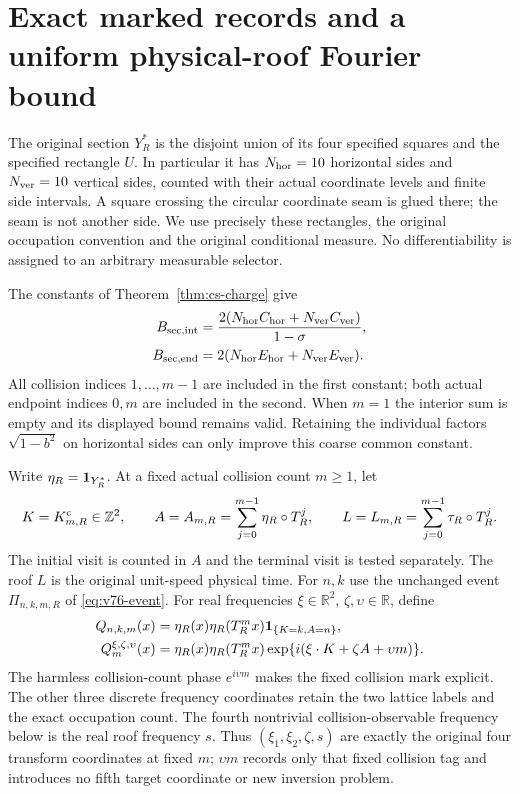 \section{Exact marked records and a uniform physical-roof Fourier bound}
\label{sec:rv-records}

The original section $Y_R^*$ is the disjoint union of its four
specified squares and the specified rectangle $U$. In particular it
has $N_{\rm hor}=10$ horizontal sides and $N_{\rm ver}=10$ vertical
sides, counted with their actual coordinate levels and finite side
intervals. A square crossing the circular coordinate seam is glued
there; the seam is not another side. We use precisely these rectangles,
the original occupation convention and the original conditional measure.
No differentiability is assigned to an arbitrary measurable selector.

The constants of Theorem~\ref{thm:cs-charge} give
\begin{align}
 B_{\rm sec,int}
   &=\frac{2(N_{\rm hor}C_{\rm hor}
                          +N_{\rm ver}C_{\rm ver})}{1-\sigma},
                                                        \label{eq:rv-section-budget}\\
 B_{\rm sec,end}
   &=2(N_{\rm hor}E_{\rm hor}+N_{\rm ver}E_{\rm ver}).\notag
\end{align}
All collision indices $1,\ldots,m-1$ are included in the first
constant; both actual endpoint indices $0,m$ are included in the
second. When $m=1$ the interior sum is empty and its displayed
bound remains valid. Retaining the individual factors
$\sqrt{1-b^2}$ on horizontal sides can only improve this coarse
common constant.

Write $\eta_R=\mathbf1_{Y_R^*}$. At a fixed actual collision count
$m\ge1$, let
\[
 K=K^{\rm c}_{m,R}\in\mathbb Z^2,\qquad
 A=A_{m,R}=\sum_{j=0}^{m-1}\eta_R\circ T_R^j,\qquad
 L=L_{m,R}=\sum_{j=0}^{m-1}\tau_R\circ T_R^j.
\]
The initial visit is counted in $A$ and the terminal visit is tested
separately. The roof $L$ is the original unit-speed physical time.
For $n,k$ use the unchanged event $\Pi_{n,k,m,R}$ of
\eqref{eq:v76-event}. For real frequencies
$\xi\in\mathbb R^2$, $\zeta,\upsilon\in\mathbb R$, define
\begin{align}
 Q_{n,k,m}(x)
  &=\eta_R(x)\eta_R(T_R^mx)
                         \mathbf1_{\{K=k,A=n\}},\notag\\
 Q_m^{\xi,\zeta,\upsilon}(x)
  &=\eta_R(x)\eta_R(T_R^mx)
             \exp\{i(\xi\cdot K+\zeta A+\upsilon m)\}.
                                                        \label{eq:rv-weights}
\end{align}
The harmless collision-count phase $e^{i\upsilon m}$ makes the
fixed collision mark explicit. The other three discrete frequency
coordinates retain the two lattice labels and the exact occupation
count. The fourth nontrivial collision-observable frequency below is
the real roof frequency $s$. Thus $(\xi_1,\xi_2,\zeta,s)$
are exactly the original four transform coordinates at fixed $m$;
$\upsilon m$ records only that fixed collision tag and introduces
no fifth target coordinate or new inversion problem.

